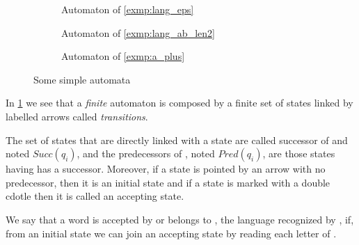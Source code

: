\begin{figure}
  \centering
  \begin{subfigure}[b]{0.45\textwidth}
    \centering
    \caption{Automaton of \cref{exmp:lang_eps}}
  \end{subfigure}
  \begin{subfigure}[b]{0.45\textwidth}
    \centering
    \caption{Automaton of \cref{exmp:lang_ab_len2}}
  \end{subfigure}
  \begin{subfigure}[b]{0.45\textwidth}
    \centering
    \caption{Automaton of \cref{exmp:a_plus}}
  \end{subfigure}
  \caption{Some simple automata}
  \label{simple_automata}
\end{figure}

In \cref{simple_automata} we see that a \textit{finite} automaton is composed by a finite set of states linked by labelled arrows called \textit{transitions}.

The set of states that are directly linked with a state \qi{} are called successor of \qi{} and noted $Succ(q_i)$, and the predecessors of \qi{}, noted $Pred(q_i)$, are those states having \qi{} has a successor. Moreover, if a state is pointed by an arrow with no predecessor, then it is an initial state and if a state is marked with a double cdotle then it is called an accepting state.

We say that a word \word{} is accepted by \automaton{} or belongs to \langA{}, the language recognized by \automaton{}, if, from an initial state we can join an accepting state by reading each letter of \word{}.

